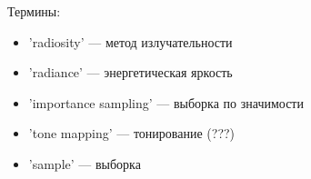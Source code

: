\documentclass[12pt]{article}
\begin{document}
\newpage
Термины:

\begin{itemize}
\item[] 'radiosity' --- метод излучательности
\item[] 'radiance' --- энергетическая яркость
\item[] 'importance sampling' --- выборка по значимости
\item[] 'tone mapping' --- тонирование (???)
\item[] 'sample' --- выборка
\end{itemize}
\end{document}
